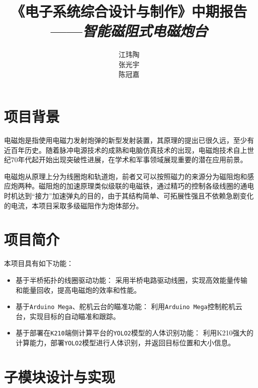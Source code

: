\documentclass{article}
\title{《电子系统综合设计与制作》中期报告\\——\textit{智能磁阻式电磁炮台}}
\author{江玮陶\quad 2023010631\\张光宇\quad 2023010629\\陈冠嘉\quad 2023010503}
\begin{document}
\maketitle
\tableofcontents
\section{项目背景}
电磁炮是指使用电磁力发射炮弹的新型发射装置，其原理的提出已很久远，至少有近百年历史。随着脉冲电源技术的成熟和电脑仿真技术的出现，电磁炮技术自上世纪70年代起开始出现突破性进展，在学术和军事领域展现重要的潜在应用前景。

电磁炮从原理上分为线圈炮和轨道炮，前者又可以按照磁力的来源分为磁阻炮和感应炮两种。磁阻炮的加速原理类似级联的电磁铁，通过精巧的控制各级线圈的通电时机达到“接力”加速弹丸的目的，由于其结构简单、可拓展性强且不依赖急剧变化的电流，本项目采取多级磁阻作为炮体部分。
\section{项目简介}
本项目具有如下功能：
\begin{itemize}
    \item 基于半桥拓扑的线圈驱动功能： 采用半桥电路驱动线圈，实现高效能量传输和能量回收，提高电磁炮的效率和性能。
    \item 基于\texttt{Arduino Mega}、舵机云台的瞄准功能： 利用\texttt{Arduino Mega}控制舵机云台，实现目标的自动瞄准和跟踪。
    \item 基于部署在\texttt{K210}端侧计算平台的\texttt{YOLO2}模型的人体识别功能： 利用K210强大的计算能力，部署\texttt{YOLO2}模型进行人体识别，并返回目标位置和大小信息。
\end{itemize}
\section{子模块设计与实现}
\end{document}
